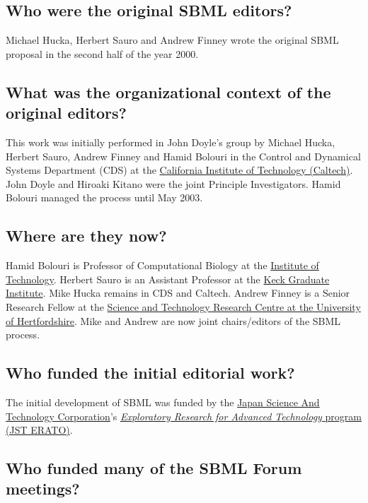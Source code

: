 \documentclass{sbmlfaq}
\begin{document}
\subsection{Who were the original SBML editors?}

Michael Hucka, Herbert Sauro and Andrew Finney wrote the original SBML
proposal in the second half of the year 2000.

\subsection{What was the organizational context of the original editors?}

This work was initially performed in John Doyle's group by Michael Hucka,
Herbert Sauro, Andrew Finney and Hamid Bolouri in the Control and Dynamical
Systems Department (CDS) at the \href{http://www.caltech.edu}{California
  Institute of Technology (Caltech)}.  John Doyle and Hiroaki Kitano were
the joint Principle Investigators.  Hamid Bolouri managed the process until
May 2003.

\subsection{Where are they now?}

Hamid Bolouri is Professor of Computational Biology at the
\href{http://www.systemsbiology.org}{Institute of Technology}.  Herbert
Sauro is an Assistant Professor at the \href{http://www.kgi.edu}{Keck
  Graduate Institute}.  Mike Hucka remains in CDS and Caltech.  Andrew
Finney is a Senior Research Fellow at the
\href{http://strc.herts.ac.uk/}{Science and Technology Research Centre at
  the University of Hertfordshire}.  Mike and Andrew are now joint
chairs/editors of the SBML process.

\subsection{Who funded the initial editorial work?}

The initial development of SBML was funded by the
\href{http://www.jst.go.jp/EN/}{Japan Science And Technology Corporation}'s
\href{http://www.jst.go.jp/erato/}{\emph{Exploratory Research for Advanced
  Technology} program (JST ERATO)}.

\subsection{Who funded many of the SBML Forum meetings?}
\end{document}
